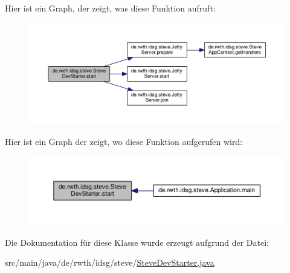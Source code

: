 Hier ist ein Graph, der zeigt, was diese Funktion aufruft\+:\nopagebreak
\begin{figure}[H]
\begin{center}
\leavevmode
\includegraphics[width=350pt]{classde_1_1rwth_1_1idsg_1_1steve_1_1_steve_dev_starter_a0e3fc501804bc0da47011cb05d70a494_cgraph}
\end{center}
\end{figure}




Hier ist ein Graph der zeigt, wo diese Funktion aufgerufen wird\+:\nopagebreak
\begin{figure}[H]
\begin{center}
\leavevmode
\includegraphics[width=350pt]{classde_1_1rwth_1_1idsg_1_1steve_1_1_steve_dev_starter_a0e3fc501804bc0da47011cb05d70a494_icgraph}
\end{center}
\end{figure}




Die Dokumentation für diese Klasse wurde erzeugt aufgrund der Datei\+:\begin{DoxyCompactItemize}
\item 
src/main/java/de/rwth/idsg/steve/\hyperlink{_steve_dev_starter_8java}{Steve\+Dev\+Starter.\+java}\end{DoxyCompactItemize}
